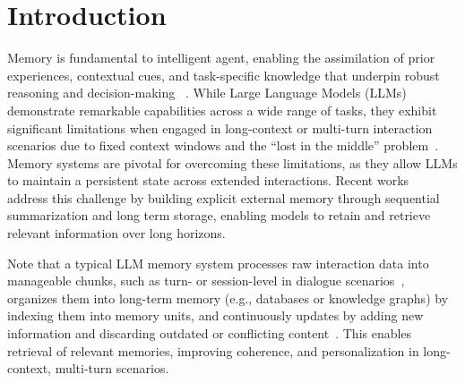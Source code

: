 \section{Introduction}
Memory is fundamental to intelligent agent, enabling the assimilation of prior experiences, contextual cues, and task-specific knowledge that underpin robust reasoning and decision-making ~\citep{wang2024towards,behrouz2024titans,du2025rethinking,zhang2024surveymemorymechanismlarge}.
While Large Language Models (LLMs)~\citep{deepseekr1,gpt4} demonstrate remarkable capabilities across a wide range of tasks, they exhibit significant limitations when engaged in long-context or multi-turn interaction scenarios due to fixed context windows and the ``lost in the middle'' problem~\citep{LostinMiddle}.
Memory systems are pivotal for overcoming these limitations, as they allow LLMs to maintain a persistent state across extended interactions.
Recent works~\citep{Li2025MemOSAO,memory3,Chhikara2025Mem0BP,Kang2025MemoryOO} address this challenge by building explicit external memory through sequential summarization and long term storage, enabling models to retain and retrieve relevant information over long horizons.

Note that a typical LLM memory system processes raw interaction data into manageable chunks, such as turn- or session-level in dialogue scenarios~\citep{Xu2025AMEMAM, li2025helloagainllmpoweredpersonalized}, organizes them into long-term memory (e.g., databases or knowledge graphs) by indexing them into memory units, and continuously updates by adding new information and discarding outdated or conflicting content~\citep{DBLP:conf/aaai/ZhongGGYW24}. 
This enables retrieval of relevant memories, improving coherence, and personalization in long-context, multi-turn scenarios.


